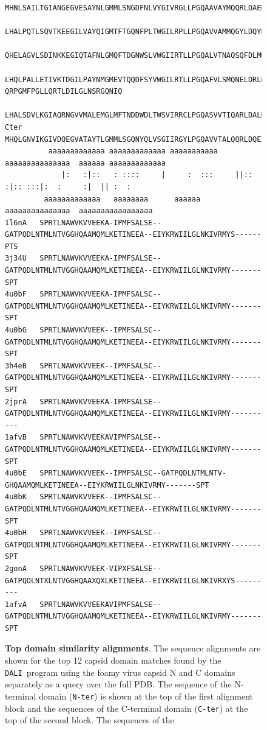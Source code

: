 \documentclass{bmcart}
\newcommand{\DALI}{{\tt DALI}}
\begin{document}
\begin{figure}
\begin{tiny}
\begin{Verbatim}[frame=single]
        MHNLSAILTGIANGEGVESAYNLGMMLSNGDFNLVYGIVRGLLPGQAAVAYMQQRLDAEPSDALRAQNFIQHLHLVYEILGLNHRGQSIR
        LHALPQTLSQVTKEEGILVAYQIGMTFTGQNFPLTWGILRPLLPGQAVVAMMQGYLDQYPTDDLKAVNFASILRRVFDILGLNYMGQNIR
        QHELAGVLSDINKKEGIQTAFNLGMQFTDGNWSLVWGIIRTLLPGQALVTNAQSQFDLMGDDIQRAENFPRVINNLYTMLGLNIHGQSIR
        LHQLPALLETIVKTDGILPAYNMGMEVTQQDFSYVWGILRTLLPGQAFVLSMQNELDRLPAA QRPGMFPGLLQRTLDILGLNSRGQNIQ
        LHALSDVLKGIAQRNGVVMALEMGLMFTNDDWDLTWSVIRRCLPGQASVVTIQARLDALPNNQARIIQAGFIIREVYEVLGLDPLGRPLN
Cter    MHQLGNVIKGIVDQEGVATAYTLGMMLSGQNYQLVSGIIRGYLPGQAVVTALQQRLDQEIDNQTRAETFIQHLNAVYEILGLNARGQSIR
          aaaaaaaaaaaaa aaaaaaaaaaaaa aaaaaaaaaaa   aaaaaaaaaaaaaaa  aaaaaa aaaaaaaaaaaaa
             |:   :|::   : ::::     |     :  :::     ||:: :|:: :::|:  :     :|  || :  :    
         aaaaaaaaaaaaa   aaaaaaaa      aaaaaa        aaaaaaaaaaaaaaa  aaaaaaaaaaaaaaaaa
1l6nA   SPRTLNAWVKVVEEKA-IPMFSALSE--GATPQDLNTMLNTVGGHQAAMQMLKETINEEA--EIYKRWIILGLNKIVRMYS------PTS
3j34U   SPRTLNAWVKVVEEKA-IPMFSALSE--GATPQDLNTMLNTVGGHQAAMQMLKETINEEA--EIYKRWIILGLNKIVRMY-------SPT
4u0bF   SPRTLNAWVKVVEEKA-IPMFSALSC--GATPQDLNTMLNTVGGHQAAMQMLKETINEEA--EIYKRWIILGLNKIVRMY-------SPT
4u0bG   SPRTLNAWVKVVEEK--IPMFSALSC--GATPQDLNTMLNTVGGHQAAMQMLKETINEEA--EIYKRWIILGLNKIVRMY-------SPT
3h4eB   SPRTLNAWVKVVEEK--IPMFSALSC--GATPQDLNTMLNTVGGHQAAMQMLKETINEEA--EIYKRWIILGLNKIVRMY-------SPT
2jprA   SPRTLNAWVKVVEEKA-IPMFSALSE--GATPQDLNTMLNTVGGHQAAMQMLKETINEEA--EIYKRWIILGLNKIVRMY----------
1afvB   SPRTLNAWVKVVEEKAVIPMFSALSE--GATPQDLNTMLNTVGGHQAAMQMLKETINEEA--EIYKRWIILGLNKIVRMY-------SPT
4u0bE   SPRTLNAWVKVVEEK--IPMFSALSC--GATPQDLNTMLNTV-GHQAAMQMLKETINEEA--EIYKRWIILGLNKIVRMY-------SPT
4u0bK   SPRTLNAWVKVVEEK--IPMFSALSC--GATPQDLNTMLNTVGGHQAAMQMLKETINEEA--EIYKRWIILGLNKIVRMY-------SPT
4u0bH   SPRTLNAWVKVVEEK--IPMFSALSC--GATPQDLNTMLNTVGGHQAAMQMLKETINEEA--EIYKRWIILGLNKIVRMY-------SPT
2gonA   SPRTLNAWVKVVEEK-VIPXFSALSE--GATPQDLNTXLNTVGGHQAAXQXLKETINEEA--EIYKRWIILGLNKIVRXYS---------
1afvA   SPRTLNAWVKVVEEKAVIPMFSALSE--GATPQDLNTMLNTVGGHQAAMQMLKETINEEA--EIYKRWIILGLNKIVRMY-------SPT
\end{Verbatim}
\end{tiny}
\begin{footnotesize}
\caption{
\label{Fig:swap}
{\bf Top domain similarity alignments}.
The sequence alignments are shown for the top 12 capsid domain matches found by the \DALI\ program
using the foamy virus capsid N and C domains separately as a query over the full PDB.
The sequence of the N-terminal domain ({\tt N-ter}) is shown at the top of the first alignment block and the
sequences of the C-terminal domain ({\tt C-ter}) at the top of the second block.   The sequences of the
}
\end{footnotesize}
\end{figure}
\end{document}
